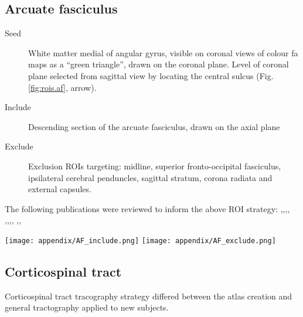 \subsection{Arcuate fasciculus}

\begin{description}
  \item[Seed] White matter medial of angular gyrus, visible on coronal views of colour \gls{fa} maps as a ``green triangle'', drawn on the coronal plane.
  Level of coronal plane selected from sagittal view by locating the central sulcus (Fig. \ref{fig:rois.af}, arrow).
  \item[Include] Descending section of the arcuate fasciculus, drawn on the axial plane
  \item[Exclude] Exclusion ROIs targeting: midline, superior fronto-occipital fasciculus, ipsilateral cerebral penduncles, sagittal stratum, corona radiata and external capsules.
\end{description}

The following publications were reviewed to inform the above ROI strategy: \textcite{Brown2014a},\textcite{Catani2002},\textcite{Catani2005},\textcite{Chen2015c},
\textcite{Eluvathingal2007},\textcite{Kamali2014},\textcite{Martino2013a},\textcite{Nucifora2005},
\textcite{Parker2005},\textcite{Bain2019},\textcite{Talozzi2018}

\begin{figure*}[h]
  \centering
    \texttt{[image: appendix/AF\_include.png]}
    \texttt{[image: appendix/AF\_exclude.png]}
  \caption{Seed (yellow), inclusion (green) and exclusion (red) \glspl{roi} for the arcuate fasciculus. Arrow indicates central sulcus, landmark for seed ROI.}
  \label{fig:rois.af}
\end{figure*}

\subsection{Corticospinal tract}

Corticospinal tract tracography strategy differed between the atlas creation and general tractography applied to new subjects.

